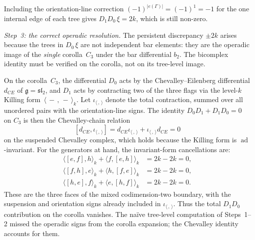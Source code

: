 \begin{example}
Including the orientation-line correction
$(-1)^{|e(\Gamma)|} = (-1)^1 = -1$ for the one internal
edge of each tree gives $D_1 D_0\,\xi = 2k$, which is still
non-zero.

\smallskip\noindent
\emph{Step~3: the correct operadic resolution.}
The persistent discrepancy $\pm 2k$ arises because the trees
in $D_0\,\xi$ are not independent bar elements: they are the
operadic image of the \emph{single} corolla~$C_3$ under the
bar differential $b_2$. The bicomplex identity must be
verified on the corolla, not on its tree-level image.

On the corolla~$C_3$, the differential $D_0$ acts by the
Chevalley--Eilenberg differential $d_{CE}$ of
$\mathfrak{g} = \mathfrak{sl}_2$, and $D_1$ acts by contracting
two of the three flags via the level-$k$ Killing
form~$\langle\,-\,,\,-\,\rangle_k$. Let
$\iota_{\langle\, ,\,\rangle}$ denote the total contraction,
summed over all unordered pairs with the orientation-line signs.
The identity $D_0 D_1 + D_1 D_0 = 0$ on $C_3$ is then the
Chevalley-chain relation
\[
[d_{CE},\iota_{\langle\, ,\,\rangle}]
= d_{CE}\iota_{\langle\, ,\,\rangle}
+ \iota_{\langle\, ,\,\rangle}d_{CE}=0
\]
on the suspended Chevalley complex, which holds because the
Killing form is
$\operatorname{ad}$-invariant.
For the generators at hand, the invariant-form cancellations are:
\begin{align*}
\langle [e,f],h\rangle_k+\langle f,[e,h]\rangle_k
&= 2k-2k=0, \\
\langle [f,h],e\rangle_k+\langle h,[f,e]\rangle_k
&= 2k-2k=0, \\
\langle [h,e],f\rangle_k+\langle e,[h,f]\rangle_k
&= 2k-2k=0.
\end{align*}
These are the three faces of the mixed codimension-two boundary,
with the suspension and orientation signs already included in
$\iota_{\langle\, ,\,\rangle}$. Thus the total $D_1D_0$
contribution on the corolla vanishes.
The na\"ive tree-level computation of Steps~1--2 missed
the operadic signs from the corolla expansion; the Chevalley
identity accounts for them.
\end{example}

